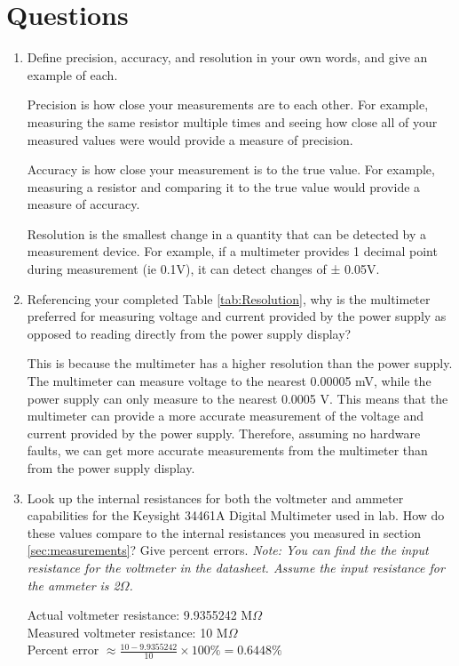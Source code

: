 \documentclass[12pt]{article}
\begin{document}
\section{Questions}
\begin{enumerate}
\item Define precision, accuracy, and resolution in your own words, and give an example of each.

Precision is how close your measurements are to each other. For example, measuring the same resistor multiple times and seeing how close all of your measured values were would provide a measure of precision.

Accuracy is how close your measurement is to the true value. For example, measuring a resistor and comparing it to the true value would provide a measure of accuracy.

Resolution is the smallest change in a quantity that can be detected by a measurement device. For example, if a multimeter provides 1 decimal point during measurement (ie 0.1V), it can detect changes of ± 0.05V.


\item Referencing your completed Table \ref{tab:Resolution}, why is the multimeter preferred for measuring voltage and current provided by the power supply as opposed to reading directly from the power supply display?

This is because the multimeter has a higher resolution than the power supply. 
The multimeter can measure voltage to the nearest 0.00005 mV, 
while the power supply can only measure to the nearest 0.0005 V. 
This means that the multimeter can provide a more accurate measurement of the voltage and current provided by the power supply.
Therefore, assuming no hardware faults, we can get more accurate measurements from the multimeter than from the power supply display.

\item Look up the internal resistances for both the voltmeter and ammeter capabilities for the Keysight 34461A Digital Multimeter used in lab. How do these values compare to the internal resistances you measured in section \ref{sec:measurements}? Give percent errors. \textit{Note: You can find the the input resistance for the voltmeter in the datasheet. Assume the input resistance for the ammeter is 2$\Omega$.}

Actual voltmeter resistance: 9.9355242 M$\Omega$ \\
Measured voltmeter resistance: 10 M$\Omega$ \\
Percent error $\approx \frac{10 - 9.9355242}{10} \times 100\% = 0.6448\%$


\end{enumerate}
\end{document}

